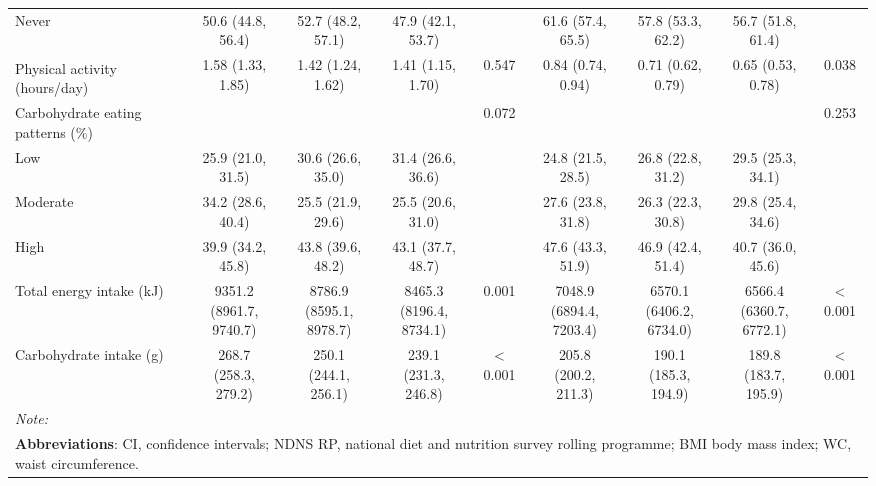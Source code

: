 \begin{table}
\begin{tabular}[t]{lcccccccc}
			\hspace{1em}Never & 50.6 (44.8, 56.4) & 52.7 (48.2, 57.1) & 47.9 (42.1, 53.7) &  & 61.6 (57.4, 65.5) & 57.8 (53.3, 62.2) & 56.7 (51.8, 61.4) & \\
			Physical activity\textsuperscript{\dag} (hours/day) & 1.58 (1.33, 1.85) & 1.42 (1.24, 1.62) & 1.41 (1.15, 1.70) & 0.547 & 0.84 (0.74, 0.94) & 0.71 (0.62, 0.79) & 0.65 (0.53, 0.78) & 0.038\\
			Carbohydrate eating patterns (\%) &  &  &  & 0.072 &  &  &  & 0.253\\
			\hspace{1em}Low & 25.9 (21.0, 31.5) & 30.6 (26.6, 35.0) & 31.4 (26.6, 36.6) &  & 24.8 (21.5, 28.5) & 26.8 (22.8, 31.2) & 29.5 (25.3, 34.1) & \\
			\hspace{1em}Moderate & 34.2 (28.6, 40.4) & 25.5 (21.9, 29.6) & 25.5 (20.6, 31.0) &  & 27.6 (23.8, 31.8) & 26.3 (22.3, 30.8) & 29.8 (25.4, 34.6) & \\
			\hspace{1em}High & 39.9 (34.2, 45.8) & 43.8 (39.6, 48.2) & 43.1 (37.7, 48.7) &  & 47.6 (43.3, 51.9) & 46.9 (42.4, 51.4) & 40.7 (36.0, 45.6) & \\
			Total energy intake (kJ) & \Centerstack{9351.2 \\ (8961.7, 9740.7)} & \Centerstack{8786.9 \\ (8595.1, 8978.7)} & \Centerstack{8465.3 \\ (8196.4, 8734.1)} & 0.001 & \Centerstack{7048.9 \\ (6894.4, 7203.4)} & \Centerstack{6570.1 \\(6406.2, 6734.0)} & \Centerstack{6566.4 \\ (6360.7, 6772.1)} & < 0.001\\
			Carbohydrate intake (g) & \Centerstack{268.7 \\ (258.3, 279.2)} & \Centerstack{250.1\\ (244.1, 256.1)} & \Centerstack{239.1 \\ (231.3, 246.8)} & < 0.001 & \Centerstack{205.8 \\(200.2, 211.3)} & \Centerstack{190.1 \\ (185.3, 194.9)} & \Centerstack{189.8 \\ (183.7, 195.9)} & < 0.001\\
			\bottomrule
			\multicolumn{9}{l}{{\scriptsize \textit{Note: }}}\\
			\multicolumn{9}{l}{{\scriptsize \textbf{Abbreviations}: CI, confidence intervals; NDNS RP, national diet and nutrition survey rolling programme; BMI body mass index; WC, waist circumference.}}\\

\end{tabular}
\end{table}
